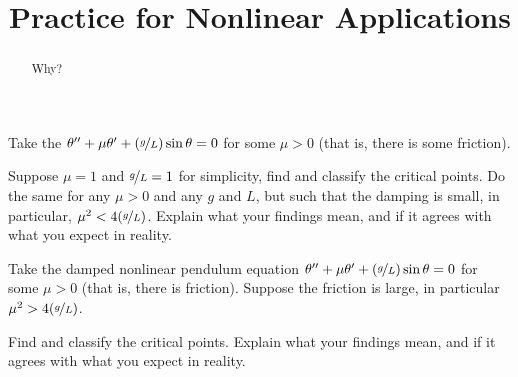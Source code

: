 \documentclass{ximera}
\title{Practice for Nonlinear Applications}
\begin{document}
\begin{abstract}
Why?
\end{abstract}
\maketitle


\begin{exercise}
    Take the \emph{} $\theta '' + \mu \theta' + (\nicefrac{g}{L}) \sin \theta = 0$ for some $\mu > 0$ (that is, there is some friction).
    \begin{tasks}
        \task Suppose $\mu = 1$ and $\nicefrac{g}{L} = 1$ for simplicity, find and classify the critical points.
        \task Do the same for any $\mu > 0$ and any $g$ and $L$, but such that the damping is small, in particular, $\mu^2 < 4(\nicefrac{g}{L})$.
        \task Explain what your findings mean, and if it agrees with what you expect in reality.
    \end{tasks}
\end{exercise}

\begin{exercise}%
    Take the damped nonlinear pendulum equation $\theta '' + \mu \theta' + (\nicefrac{g}{L}) \sin \theta = 0$ for some $\mu > 0$ (that is, there is friction). Suppose the friction is large, in particular $\mu^2 > 4 (\nicefrac{g}{L})$.
    \begin{tasks}
        \task Find and classify the critical points.
        \task Explain what your findings mean, and if it agrees with what you expect in reality.
    \end{tasks}
\end{exercise}
\end{document}
